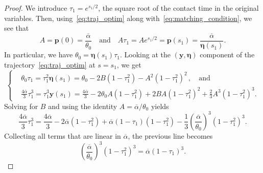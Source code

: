 \documentclass[AHL,Unicode,longabstracts]{cedram}
\newcommand{\bp}{\mathbf{p}}
\newcommand{\by}{\mathbf{y}}
\newcommand{\beeta}{\boldsymbol{\eta}}
\newcommand{\1}{\mathds{1}}
\begin{document}
\begin{proof}
We introduce $\tau_1 = e^{s_1/2}$, the square root of the contact time in the original variables. Then, using~\eqref{eq:traj_optim} along with~\eqref{eq:matching_condition}, we see that
\begin{equation}\label{eq:A}
A = \bp(0) = \frac{\overline\alpha}{\theta_0}
\quad \text{and} \quad A\tau_1 = A e^{s_1/2} = \bp(s_1) = \frac{\overline\alpha}{\beeta(s_1)}.
\end{equation}
In particular, we have $\theta_0 = \beeta(s_1)\tau_1$. Looking at the $(\by,\beeta)$ component of the trajectory~\eqref{eq:traj_optim} at $s=s_1$, we get
\[
\begin{cases}
&\displaystyle \theta_0 \tau_1 = \tau_1^2 \beeta(s_1) = \theta_0 - 2 B\left(1-\tau_1^2\right) - A^2 \left(1-\tau_1^2\right)^2\,,
\quad \text{and}\quad
\\[0.10em]
&\displaystyle \frac{4\overline\alpha}{3}\tau_1^{3} = \tau_1^{3}\by(s_1) = \frac{4\overline\alpha}{3} - 2\theta_0 A \left(1 - \tau_1^2\right) + 2BA \left(1-\tau_1^2\right)^2 + \frac{2}{3} A^3 \left(1-\tau_1^2\right)^3.
\end{cases}
\]
Solving for $B$ and using the identity $A = \overline \alpha / \theta_0$ yields
\[
\frac{4\overline \alpha}{3} \tau_1^3 = \frac{4\overline\alpha}{3} - 2 \overline\alpha \left(1- \tau_1^2\right) + \overline\alpha (1 - \tau_1)\left(1 - \tau_1^2\right) - \frac{1}{3}\left(\frac{\overline\alpha}{\theta_0}\right)^3 \left(1-\tau_1^2\right)^3.
\]
Collecting all terms that are linear in $\overline \alpha$, the previous line becomes
\begin{equation}\label{eq:cubic}
\left(\frac{\overline\alpha}{\theta_0}\right)^3 \left(1-\tau_1^2\right)^3 = \overline \alpha \left(1- \tau_1\right)^3.
\end{equation}




\end{proof}
\end{document}
